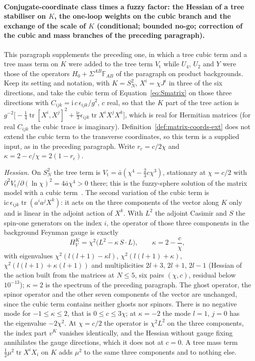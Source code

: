 \paragraph{Conjugate-coordinate class times a fuzzy factor: the Hessian of a tree stabiliser on \(K\), the one-loop weights on the cubic branch and the exchange of the scale of \(K\) (conditional; bounded no-go; correction of the cubic and mass branches of the preceding paragraph).}
This paragraph supplements the preceding one, in which a tree cubic term and a tree mass term on \(K\) were added to the tree term \(V_{\mathrm t}\) while \(U_4\), \(U_2\) and \(Y\) were those of the operators \(H_0+\Sigma^{AB}\mathbb F_{AB}\) of the paragraph on product backgrounds. Keep its setting and notation, with \(K=S^2_N\), \(X^i=\chi J^i\) in three of the six directions, and take the cubic term of Equation~\eqref{eq:Smatrix} on those three directions with \(C_{ijk}=\mathrm i\,c\,\epsilon_{ijk}/g^2\), \(c\) real, so that the \(K\) part of the tree action is \(g^{-2}\bigl[-\tfrac14\operatorname{tr}[X^i,X^j]^2+\tfrac{\mathrm ic}{3}\epsilon_{ijk}\operatorname{tr}X^iX^jX^k\bigr]\), which is real for Hermitian matrices (for real \(C_{ijk}\) the cubic trace is imaginary). Definition~\ref{def:matrix-coords-ext} does not extend the cubic term to the transverse coordinates, so this term is a supplied input, as in the preceding paragraph. Write \(r_c=c/2\chi\) and \(\kappa=2-c/\chi=2(1-r_c)\).

\emph{Hessian.} On \(S^2_N\) the tree term is \(V_{\mathrm t}=\bar a(\chi^4-\tfrac23c\chi^3)\), stationary at \(\chi=c/2\) with \(\partial^2V_{\mathrm t}/\partial(\ln\chi)^2=4\bar a\chi^4>0\) there; this is the fuzzy-sphere solution of the matrix model with a cubic term~\cite{IsoKimuraTanakaWakatsuki2001}. The second variation of the cubic term is \(\mathrm ic\,\epsilon_{ijk}\operatorname{tr}(a^ia^jX^k)\): it acts on the three components of the vector along \(K\) only and is linear in the adjoint action of \(X^k\). With \(L^2\) the adjoint Casimir and \(S\) the spin-one generators on the index \(i\), the operator of those three components in the background Feynman gauge is exactly
\[
  H_V^K=\chi^2\bigl(L^2-\kappa\,S\cdot L\bigr),\qquad \kappa=2-\frac c\chi ,
\]
with eigenvalues \(\chi^2(l(l+1)-\kappa l)\), \(\chi^2(l(l+1)+\kappa)\), \(\chi^2(l(l+1)+\kappa(l+1))\) and multiplicities \(2l+3\), \(2l+1\), \(2l-1\) (Hessian of the action built from the matrices at \(N\le5\), six pairs \((\chi,c)\), residual below \(10^{-13}\)); \(\kappa=2\) is the spectrum of the preceding paragraph. The ghost operator, the spinor operator and the other seven components of the vector are unchanged, since the cubic term contains neither ghosts nor spinors. There is no negative mode for \(-1\le\kappa\le2\), that is \(0\le c\le3\chi\); at \(\kappa=-2\) the mode \(l=1\), \(j=0\) has the eigenvalue \(-2\chi^2\). At \(\chi=c/2\) the operator is \(\chi^2L^2\) on the three components, the index part \(v^K\) vanishes identically, and the Hessian without gauge fixing annihilates the gauge directions, which it does not at \(c=0\). A tree mass term \(\tfrac12\mu^2\operatorname{tr}X^iX_i\) on \(K\) adds \(\mu^2\) to the same three components and to nothing else.

